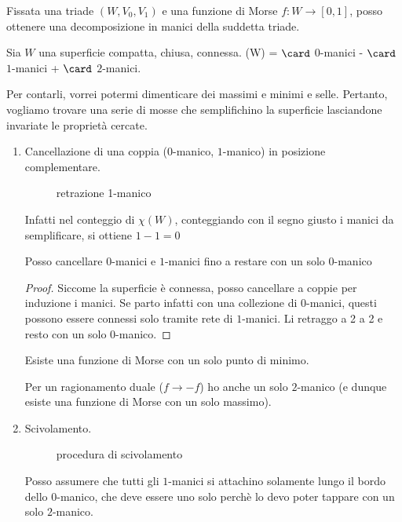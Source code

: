 
Fissata una triade $(W, V_0, V_1)$ e una funzione di Morse $f:W \rightarrow \left [0,1\right ]  $, posso ottenere una decomposizione in manici della suddetta triade.

\begin{example}
 Sia $W$ una superficie compatta, chiusa, connessa.
 \chi(W) = $\card$ $0$-manici - $\card$ $1$-manici + $\card$ $2$-manici.
\end{example}

Per contarli, vorrei potermi dimenticare dei massimi e minimi e selle. 
Pertanto, vogliamo trovare una serie di mosse che semplifichino la superficie lasciandone invariate le proprietà cercate.

\begin{enumerate}
 \item Cancellazione di una coppia ($0$-manico, $1$-manico) in posizione complementare.
 \begin{figure}
    \centering
    
    \caption{retrazione 1-manico}
\end{figure}
  Infatti nel conteggio di $\chi (W)$, conteggiando con il segno giusto i manici da semplificare, si ottiene $1-1 = 0$
  \begin{teo}
    Posso cancellare $0$-manici e $1$-manici fino a restare con un solo $0$-manico
  \end{teo}
  \begin{proof}
    Siccome la superficie è connessa, posso cancellare a coppie per induzione i manici. Se parto infatti con una collezione di $0$-manici, questi possono essere connessi solo tramite rete di $1$-manici.
    Li retraggo a 2 a 2 e resto con un solo $0$-manico.
  \end{proof}
  \begin{cor}
  Esiste una funzione di Morse con un solo punto di minimo.
  \end{cor}
  \begin{oss}
  Per un ragionamento duale ($f\rightarrow -f$) ho anche un solo $2$-manico (e dunque esiste una funzione di Morse con un solo massimo).
  \end{oss}
\item Scivolamento.
\begin{figure}
    \centering
    
    \caption{procedura di scivolamento}
\end{figure}
Posso assumere che tutti gli $1$-manici si attachino solamente lungo il bordo dello $0$-manico, che deve essere uno solo perchè lo devo poter tappare con un solo $2$-manico.
\end{enumerate}

